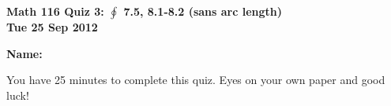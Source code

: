 \documentclass[11pt,letterpaper]{article}
\begin{document}
\flushleft
\begin{multicols}{2}


\begin{large}\textbf{Math 116 Quiz 3: $\oint$ 7.5, 8.1-8.2 (sans arc length) \\
Tue 25 Sep 2012}\end{large}

\textbf{Name:  }\underline{\hspace{35ex}}

\vspace{.5in}

\end{multicols}

\pagestyle{empty}


\flushleft

You have 25 minutes to complete this quiz.  Eyes on your own paper and good luck!
\end{document}
